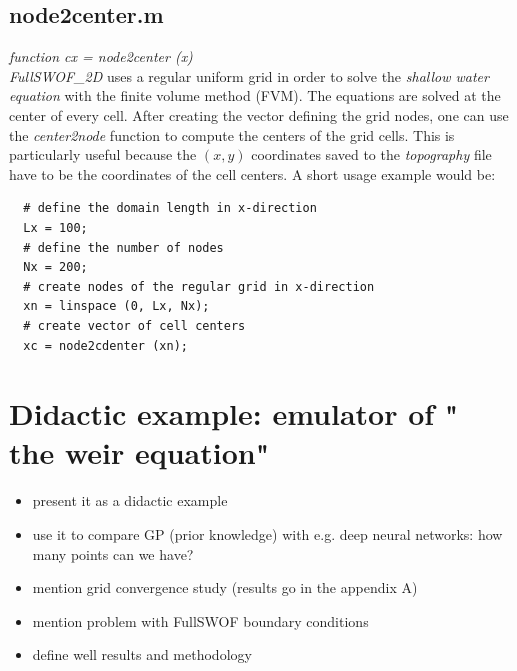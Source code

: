 \subsection*{node2center.m}
\textit{function cx = node2center (x)}\\

\textit{FullSWOF\_2D} uses a regular uniform grid in order to solve the \emph{shallow water equation} with the finite volume method (FVM).
The equations are solved at the center of every cell.
After creating the vector defining the grid nodes, one can use the \textit{center2node} function to compute the centers of the grid cells.
This is particularly useful because the $(x,y)$ coordinates saved to the \textit{topography} file have to be the coordinates of the cell centers.
A short usage example would be:

\begin{lstlisting}
  # define the domain length in x-direction
  Lx = 100;
  # define the number of nodes
  Nx = 200;
  # create nodes of the regular grid in x-direction
  xn = linspace (0, Lx, Nx);
  # create vector of cell centers
  xc = node2cdenter (xn);
\end{lstlisting}



\section{Didactic example: emulator  of " the weir equation"}

\begin{itemize}
\itemsep0em
  \item present it as a didactic example
  \item use it to compare GP (prior knowledge) with e.g. deep neural networks: how many points can we have?
  \item mention grid convergence study (results go in the appendix A)
  \item mention problem with FullSWOF boundary conditions
  \item define well results and methodology
\end{itemize}

